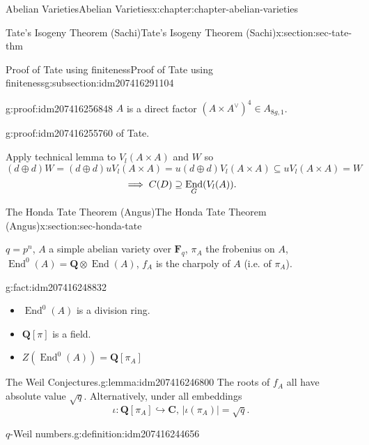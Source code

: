 \documentclass[oneside,10pt,]{book}
\newcommand{\qedhere}{\relax}
\numberwithin{equation}{section}
\newcommand{\lb}{[}
\newcommand{\rb}{]}
\newcommand{\QQ}{\mathbf{Q}}
\newcommand{\CC}{\mathbf{C}}
\newcommand{\FF}{\mathbf{F}}
\DeclareMathOperator{\End}{End}
\begin{document}
\begin{chapterptx}{Abelian Varieties}{}{Abelian Varieties}{}{}{x:chapter:chapter-abelian-varieties}
\begin{sectionptx}{Tate's Isogeny Theorem (Sachi)}{}{Tate's Isogeny Theorem (Sachi)}{}{}{x:section:sec-tate-thm}
\begin{subsectionptx}{Proof of Tate using finiteness}{}{Proof of Tate using finiteness}{}{}{g:subsection:idm207416291104}
\begin{proofptx}{}{g:proof:idm207416256848}
\(A\) is a direct factor \((A\times A^\vee)^4 \in A_{8g,1}\).%
\end{proofptx}
\begin{proofptx}{}{g:proof:idm207416255760}
of Tate.%
\par
Apply technical lemma to \(V_l(A\times A)\) and \(W\) so%
\begin{equation*}
(d\oplus d) W = (d \oplus d) uV_l(A\times A) = u(d\oplus d) V_l(A\times A) \subseteq uV_l(A\times A) = W
\end{equation*}
%
\begin{equation*}
\implies C(D) \supseteq \End_G(V_l(A))\text{.}\qedhere
\end{equation*}
%
\end{proofptx}
\end{subsectionptx}
\end{sectionptx}
%
%
\typeout{************************************************}
\typeout{************************************************}
%
\begin{sectionptx}{The Honda Tate Theorem (Angus)}{}{The Honda Tate Theorem (Angus)}{}{}{x:section:sec-honda-tate}
\begin{introduction}{}%
\(q = p^n\), \(A\) a simple abelian variety over \(\FF_q\), \(\pi_A\) the frobenius on \(A\), \(\End^0(A) = \QQ\otimes \End(A)\), \(f_A\) is the charpoly of \(A\) (i.e. of \(\pi_A\)).%
\begin{fact}{}{}{g:fact:idm207416248832}%
%
\begin{itemize}[label=\textbullet]
\item{}\(\End^0(A)\) is a division ring.%
\item{}\(\QQ\lb \pi\rb\) is a field.%
\item{}\(Z(\End^0(A)) = \QQ\lb \pi_A\rb\)%
\end{itemize}
%
\end{fact}
\begin{lemma}{The Weil Conjectures.}{}{g:lemma:idm207416246800}%
The roots of \(f_A\) all have absolute value \(\sqrt q\). Alternatively, under all embeddings%
\begin{equation*}
\iota \colon \QQ\lb \pi_A\rb \hookrightarrow \CC,\,|\iota(\pi_A)| = \sqrt q\text{.}
\end{equation*}
%
\end{lemma}
\begin{definition}{\(q\)-Weil numbers.}{g:definition:idm207416244656}%

\end{definition}
\end{introduction}
\end{sectionptx}
\end{chapterptx}
\end{document}

